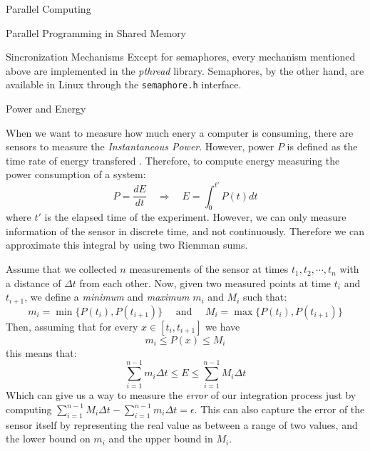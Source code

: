 \begin{section}{Parallel Computing}
\begin{subsection}{Parallel Programming in Shared Memory}
\begin{subsubsection}{Sincronization Mechanisms}
Except for semaphores, every mechanism mentioned above are implemented in
the \textit{pthread} library. Semaphores, by the other hand, are available
in Linux through the \texttt{semaphore.h} interface.


\end{subsubsection}

\begin{section}{Power and Energy}\label{sec:power}

When we want to measure how much enery a computer is consuming, there are
sensors to measure the \textit{Instantaneous Power}. However, power $P$ is defined
as the time rate of energy transfered \citep{young2006sears}. Therefore, to
compute energy measuring the power consumption of a system:
$$P = \frac{dE}{dt} \quad \Rightarrow \quad E = \int_{0}^{t'} P(t)dt$$
where $t'$ is the elapsed time of the experiment. However, we can only
measure information of the sensor in discrete time, and not continuously.
Therefore we can approximate this integral by using two Riemman sums.

Assume that we collected $n$ measurements of the sensor at times
$t_1, t_2, \cdots, t_n$ with a distance of $\Delta t$ from each other.
Now, given two measured points at time
$t_i$ and $t_{i+1}$, we define a \textit{minimum} and \textit{maximum} $m_i$ and $M_i$
such that:
$$m_i = \min\{P(t_i), P(t_{i+1})\} \quad \text{ and } \quad M_i = \max\{P(t_i), P(t_{i+1})\}$$
Then, assuming that for every $x \in [t_i, t_{i+1}]$ we have
$$m_i \leq P(x) \leq M_i$$
this means that:
$$\sum_{i=1}^{n-1} m_i\Delta t \leq E \leq \sum_{i=1}^{n-1} M_i\Delta t$$
Which can give us a way to measure the \textit{error} of our integration
process just by computing $\sum_{i=1}^{n-1} M_i\Delta t -
\sum_{i=1}^{n-1} m_i\Delta t = \epsilon$. This can also capture the error of the sensor
itself by representing the real value as between a range of two values, and
the lower bound on $m_i$ and the upper bound in $M_i$.

\end{section}


\end{subsection}
\end{section}
